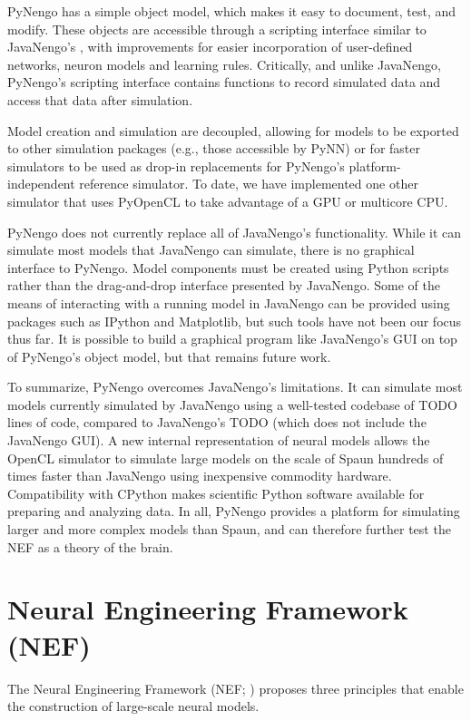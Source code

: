 \documentclass{frontiersSCNS}
\begin{document}
PyNengo has a simple object model,
which makes it easy to
document, test, and modify.
These objects are accessible
through a scripting interface
similar to JavaNengo's \cite{TODO}, %
with improvements
for easier incorporation of user-defined networks,
neuron models and learning rules.
Critically, and unlike JavaNengo,
PyNengo's scripting interface
contains functions to record simulated data
and access that data after simulation.

Model creation and simulation are decoupled,
allowing for models to be exported
to other simulation packages
(e.g., those accessible by PyNN)
or for faster simulators to be used
as drop-in replacements for PyNengo's
platform-independent reference simulator.
To date, we have implemented one other simulator
that uses PyOpenCL to take advantage
of a GPU or multicore CPU.

PyNengo does not currently
replace all of JavaNengo's functionality.
While it can simulate most
models that JavaNengo can simulate,
there is no graphical interface to PyNengo.
Model components must be created
using Python scripts rather than
the drag-and-drop interface presented by JavaNengo.
Some of the means of interacting
with a running model in JavaNengo
can be provided using packages
such as IPython and Matplotlib,
but such tools have not been our focus thus far.
It is possible to build a graphical program
like JavaNengo's GUI on top of PyNengo's object model,
but that remains future work.

To summarize, PyNengo overcomes
JavaNengo's limitations.
It can simulate most models
currently simulated by JavaNengo
using a well-tested codebase of
TODO lines of code,
compared to JavaNengo's TODO
(which does not include the JavaNengo GUI).
A new internal representation of neural models
allows the OpenCL simulator to simulate
large models on the scale of Spaun
hundreds of times faster than JavaNengo
using inexpensive commodity hardware.
Compatibility with CPython makes scientific Python software
available for preparing and analyzing data.
In all, PyNengo provides a platform for
simulating larger and more complex models than Spaun,
and can therefore further test the NEF
as a theory of the brain.

\section{Neural Engineering Framework (NEF)}

The Neural Engineering Framework (NEF; \cite{TODO})
proposes three principles
that enable the construction
of large-scale neural models.
\end{document}
